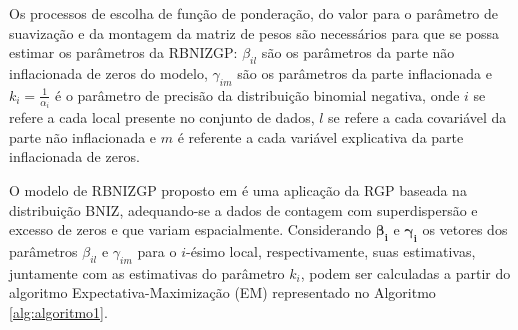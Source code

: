 \documentclass[12pt, a4paper, twoside]{report}
\numberwithin{equation}{section} %
\begin{document}
Os processos de escolha de função de ponderação, do valor para o parâmetro de suavização e da montagem da matriz de pesos são necessários para que se possa estimar os parâmetros da RBNIZGP: $\beta_{il}$ são os parâmetros da parte não inflacionada de zeros do modelo, $\gamma_{im}$ são os parâmetros da parte inflacionada e $k_i=\frac{1}{\alpha_i}$ é o parâmetro de precisão da distribuição binomial negativa, onde $i$ se refere a cada local presente no conjunto de dados, $l$ se refere a cada covariável da parte não inflacionada e $m$ é referente a cada variável explicativa da parte inflacionada de zeros.




O modelo de RBNIZGP proposto em \cite{dasilva2023} é uma aplicação da RGP baseada na distribuição BNIZ, adequando-se a dados de contagem com superdispersão e excesso de zeros e que variam espacialmente. Considerando $\boldsymbol{\beta_i}$ e $\boldsymbol{\gamma_i}$ os vetores dos parâmetros $\beta_{il}$ e $\gamma_{im}$ para o $i$-ésimo local, respectivamente, suas estimativas, juntamente com as estimativas do parâmetro $k_i$, podem ser calculadas a partir do algoritmo Expectativa-Maximização (EM) representado no Algoritmo \ref{alg:algoritmo1}.

\newpage
\end{document}
